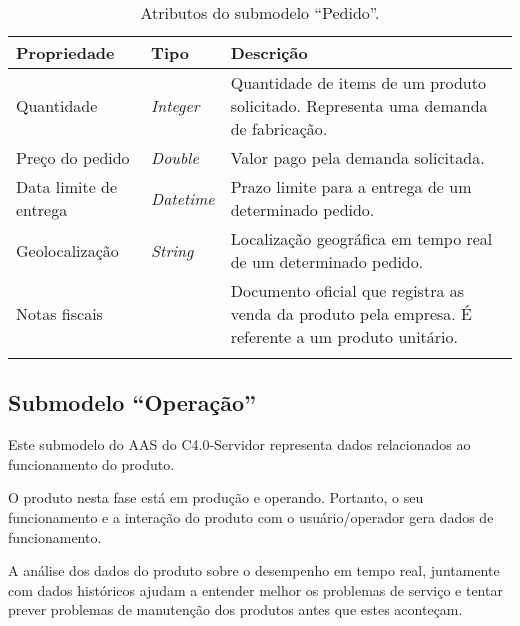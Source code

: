 \begin{longtable}{p{} p{} p{}}
	\caption{Atributos do submodelo ``Pedido''.}                                           \\
	\hline
	\textbf{Propriedade}
	 & \textbf{Tipo}
	 & \textbf{Descrição}                                                                  \\

	\hline
	Quantidade
	 & \textit{Integer}
	 & Quantidade de items de um produto solicitado. Representa uma demanda de fabricação. \\

	\hline
	Preço do pedido
	 & \textit{Double}
	 & Valor pago pela demanda solicitada.                                              \\

	\hline
	Data limite de entrega
	 & \textit{Datetime}
	 & Prazo limite para a entrega de um determinado pedido.                             \\

	\hline
	Geolocalização
	 & \textit{String}
	 & Localização geográfica em tempo real de um determinado pedido.                        \\

	 \hline
	 Notas fiscais
		& \makecell{Blob}
		& Documento oficial que registra as venda da produto pela empresa. É referente a um produto unitário.  \\

	\hline
	\label{tab:submodelo-pedido}
\end{longtable}

\subsection{Submodelo ``Operação''}

Este submodelo do AAS do C4.0-Servidor representa dados relacionados ao funcionamento do produto.

O produto nesta fase está em produção e operando. Portanto, o seu funcionamento e a interação do produto com o usuário/operador gera dados de funcionamento.

A análise dos dados do produto sobre o desempenho em tempo real, juntamente com dados históricos ajudam a entender melhor os problemas de serviço e tentar prever problemas de manutenção dos produtos antes que estes aconteçam.

